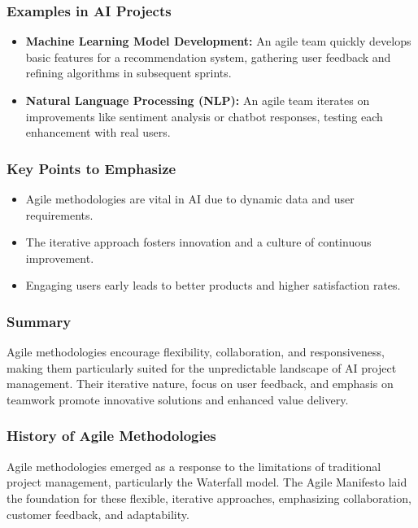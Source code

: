 \documentclass{beamer}
\begin{document}
\begin{frame}[fragile]
    \frametitle{Examples in AI Projects}
    \begin{itemize}
        \item \textbf{Machine Learning Model Development:} 
          An agile team quickly develops basic features for a recommendation system, gathering user feedback and refining algorithms in subsequent sprints.
        \item \textbf{Natural Language Processing (NLP):} 
          An agile team iterates on improvements like sentiment analysis or chatbot responses, testing each enhancement with real users.
    \end{itemize}
\end{frame}

\begin{frame}[fragile]
    \frametitle{Key Points to Emphasize}
    \begin{itemize}
        \item Agile methodologies are vital in AI due to dynamic data and user requirements.
        \item The iterative approach fosters innovation and a culture of continuous improvement.
        \item Engaging users early leads to better products and higher satisfaction rates.
    \end{itemize}
\end{frame}

\begin{frame}[fragile]
    \frametitle{Summary}
    Agile methodologies encourage flexibility, collaboration, and responsiveness, making them particularly suited for the unpredictable landscape of AI project management. Their iterative nature, focus on user feedback, and emphasis on teamwork promote innovative solutions and enhanced value delivery.
\end{frame}

\begin{frame}[fragile]
    \frametitle{History of Agile Methodologies}
    Agile methodologies emerged as a response to the limitations of traditional project management, particularly the Waterfall model. The Agile Manifesto laid the foundation for these flexible, iterative approaches, emphasizing collaboration, customer feedback, and adaptability.
\end{frame}
\end{document}
